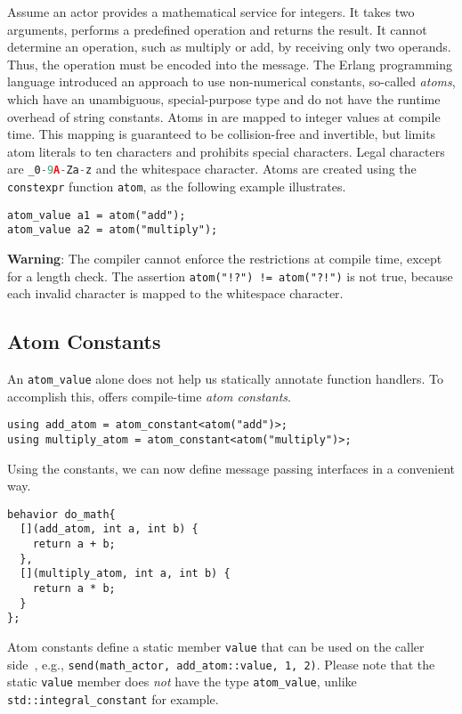 Assume an actor provides a mathematical service for integers.
It takes two arguments, performs a predefined operation and returns the result.
It cannot determine an operation, such as multiply or add, by receiving only two operands.
Thus, the operation must be encoded into the message.
The Erlang programming language introduced an approach to use non-numerical
constants, so-called \textit{atoms}, which have an unambiguous, special-purpose type and do not have the runtime overhead of string constants.
Atoms in \lib are mapped to integer values at compile time.
This mapping is guaranteed to be collision-free and invertible, but limits atom literals to ten characters and prohibits special characters.
Legal characters are \lstinline[language=C++]^_0-9A-Za-z^ and the whitespace character.
Atoms are created using the \lstinline^constexpr^ function \lstinline^atom^, as the following example illustrates.

\begin{lstlisting}
atom_value a1 = atom("add");
atom_value a2 = atom("multiply");
\end{lstlisting}

\textbf{Warning}: The compiler cannot enforce the restrictions at compile time, except for a length check.
The assertion \lstinline^atom("!?") != atom("?!")^ is not true, because each invalid character is mapped to the whitespace character.

\subsection{Atom Constants}

An \lstinline^atom_value^ alone does not help us statically annotate function handlers.
To accomplish this, \lib offers compile-time \emph{atom constants}.

\begin{lstlisting}
using add_atom = atom_constant<atom("add")>;
using multiply_atom = atom_constant<atom("multiply")>;
\end{lstlisting}

Using the constants, we can now define message passing interfaces in a convenient way.
\begin{lstlisting}
behavior do_math{
  [](add_atom, int a, int b) {
    return a + b;
  },
  [](multiply_atom, int a, int b) {
    return a * b;
  }
};
\end{lstlisting}

Atom constants define a static member \lstinline^value^ that can be used on the caller side~, e.g., \lstinline^send(math_actor, add_atom::value, 1, 2)^.
Please note that the static \lstinline^value^ member does \emph{not} have the type \lstinline^atom_value^, unlike \lstinline^std::integral_constant^ for example.
